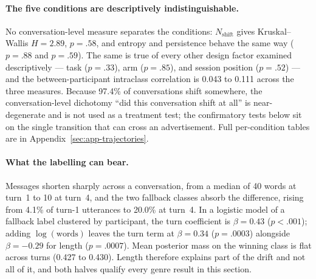 \paragraph{The five conditions are descriptively indistinguishable.}
No conversation-level measure separates the conditions: \(N_{\mathrm{shift}}\) gives Kruskal--Wallis \(H=2.89\), \(p=.58\), and entropy and persistence behave the same way (\(p=.88\) and \(p=.59\)). The same is true of every other design factor examined descriptively --- task (\(p=.33\)), arm (\(p=.85\)), and session position (\(p=.52\)) --- and the between-participant intraclass correlation is 0.043 to 0.111 across the three measures. Because 97.4\% of conversations shift somewhere, the conversation-level dichotomy ``did this conversation shift at all'' is near-degenerate and is not used as a treatment test; the confirmatory tests below sit on the single transition that can cross an advertisement. Full per-condition tables are in Appendix~\ref{sec:app-trajectories}.

\paragraph{What the labelling can bear.}
Messages shorten sharply across a conversation, from a median of 40 words at turn~1 to 10 at turn~4, and the two fallback classes absorb the difference, rising from 4.1\% of turn-1 utterances to 20.0\% at turn~4. In a logistic model of a fallback label clustered by participant, the turn coefficient is \(\beta=0.43\) (\(p<.001\)); adding \(\log(\text{words})\) leaves the turn term at \(\beta=0.34\) (\(p=.0003\)) alongside \(\beta=-0.29\) for length (\(p=.0007\)). Mean posterior mass on the winning class is flat across turns (0.427 to 0.430). Length therefore explains part of the drift and not all of it, and both halves qualify every genre result in this section.

